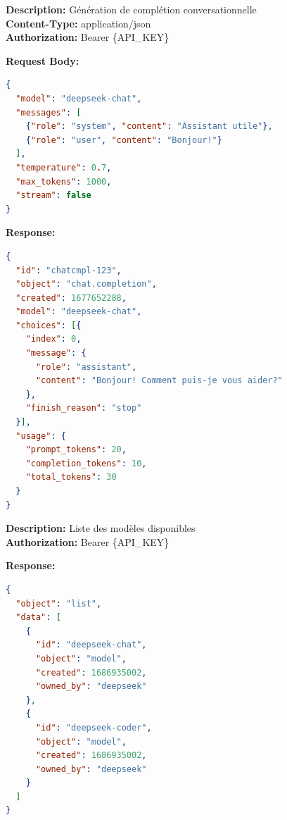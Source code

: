 \documentclass[12pt,a4paper]{article}
\begin{document}
\begin{tcolorbox}[
    enhanced,
    title={\faServer\ POST /v1/chat/completions},
    colback=primary!5,
    colframe=primary,
    fonttitle=\bfseries\ttfamily\color{white},
    coltitle=white,
    colbacktitle=primary,
    boxrule=2pt,
    arc=5mm
]
\textbf{Description:} Génération de complétion conversationnelle\\
\textbf{Content-Type:} application/json\\
\textbf{Authorization:} Bearer \{API\_KEY\}

\textbf{Request Body:}
\begin{lstlisting}[language=json]
{
  "model": "deepseek-chat",
  "messages": [
    {"role": "system", "content": "Assistant utile"},
    {"role": "user", "content": "Bonjour!"}
  ],
  "temperature": 0.7,
  "max_tokens": 1000,
  "stream": false
}
\end{lstlisting}

\textbf{Response:}
\begin{lstlisting}[language=json]
{
  "id": "chatcmpl-123",
  "object": "chat.completion",
  "created": 1677652288,
  "model": "deepseek-chat",
  "choices": [{
    "index": 0,
    "message": {
      "role": "assistant",
      "content": "Bonjour! Comment puis-je vous aider?"
    },
    "finish_reason": "stop"
  }],
  "usage": {
    "prompt_tokens": 20,
    "completion_tokens": 10,
    "total_tokens": 30
  }
}
\end{lstlisting}
\end{tcolorbox}

\vspace{0.5cm}

\begin{tcolorbox}[
    enhanced,
    title={\faList\ GET /v1/models},
    colback=success!5,
    colframe=success,
    fonttitle=\bfseries\ttfamily\color{white},
    coltitle=white,
    colbacktitle=success,
    boxrule=2pt,
    arc=5mm
]
\textbf{Description:} Liste des modèles disponibles\\
\textbf{Authorization:} Bearer \{API\_KEY\}

\textbf{Response:}
\begin{lstlisting}[language=json]
{
  "object": "list",
  "data": [
    {
      "id": "deepseek-chat",
      "object": "model",
      "created": 1686935002,
      "owned_by": "deepseek"
    },
    {
      "id": "deepseek-coder",
      "object": "model",
      "created": 1686935002,
      "owned_by": "deepseek"
    }
  ]
}
\end{lstlisting}
\end{tcolorbox}
\end{document}
